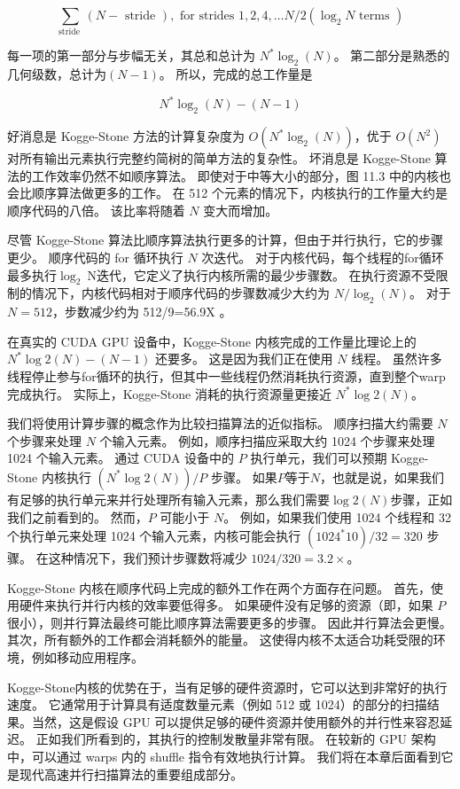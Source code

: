 $$
\sum_{\text {stride }}(N-\text { stride }), \text { for strides } 1,2,4, \ldots N / 2\left(\log_{2} N \text { terms }\right)
$$

每一项的第一部分与步幅无关，其总和总计为 $N^{*} \log _{2}(N)$。 第二部分是熟悉的几何级数，总计为$(N-1)$。 所以，完成的总工作量是

$$
N^{*} \log _{2}(N)-(N-1)
$$

好消息是 Kogge-Stone 方法的计算复杂度为 $O\left(N^{*} \log _{2}(N)\right)$，优于 $O\left(N^{ 2}\right)$ 对所有输出元素执行完整约简树的简单方法的复杂性。 坏消息是 Kogge-Stone 算法的工作效率仍然不如顺序算法。 即使对于中等大小的部分，图 11.3 中的内核也会比顺序算法做更多的工作。 在 512 个元素的情况下，内核执行的工作量大约是顺序代码的八倍。 该比率将随着 $N$ 变大而增加。

尽管 Kogge-Stone 算法比顺序算法执行更多的计算，但由于并行执行，它的步骤更少。 顺序代码的 for 循环执行 $N$ 次迭代。 对于内核代码，每个线程的for循环最多执行$\log _{2} \mathrm{~N}$迭代，它定义了执行内核所需的最少步骤数。 在执行资源不受限制的情况下，内核代码相对于顺序代码的步骤数减少大约为 $N / \log _{2}(N)$。 对于 $N=512$，步数减少约为 512/9=56.9X 。

在真实的 CUDA GPU 设备中，Kogge-Stone 内核完成的工作量比理论上的 $N^{*} \log 2(N)-(N-1)$ 还要多。 这是因为我们正在使用 $N$ 线程。 虽然许多线程停止参与for循环的执行，但其中一些线程仍然消耗执行资源，直到整个warp完成执行。 实际上，Kogge-Stone 消耗的执行资源量更接近 $N^{*} \log 2(N)$。

我们将使用计算步骤的概念作为比较扫描算法的近似指标。 顺序扫描大约需要 $N$ 个步骤来处理 $N$ 个输入元素。 例如，顺序扫描应采取大约 1024 个步骤来处理 1024 个输入元素。 通过 CUDA 设备中的 $P$ 执行单元，我们可以预期 Kogge-Stone 内核执行 $\left(N^{*} \log 2(N)\right) / P$ 步骤。 如果$P$等于$N$，也就是说，如果我们有足够的执行单元来并行处理所有输入元素，那么我们需要$\log 2(N)$步骤，正如我们之前看到的。 然而，$P$ 可能小于 $N$。 例如，如果我们使用 1024 个线程和 32 个执行单元来处理 1024 个输入元素，内核可能会执行 $\left(1024^{*} 10\right) / 32=320$ 步骤。 在这种情况下，我们预计步骤数将减少 $1024 / 320=3.2 \times$。

Kogge-Stone 内核在顺序代码上完成的额外工作在两个方面存在问题。 首先，使用硬件来执行并行内核的效率要低得多。 如果硬件没有足够的资源（即，如果 $P$ 很小），则并行算法最终可能比顺序算法需要更多的步骤。 因此并行算法会更慢。 其次，所有额外的工作都会消耗额外的能量。 这使得内核不太适合功耗受限的环境，例如移动应用程序。

Kogge-Stone内核的优势在于，当有足够的硬件资源时，它可以达到非常好的执行速度。 它通常用于计算具有适度数量元素（例如 512 或 1024）的部分的扫描结果。当然，这是假设 GPU 可以提供足够的硬件资源并使用额外的并行性来容忍延迟。 正如我们所看到的，其执行的控制发散量非常有限。 在较新的 GPU 架构中，可以通过 warps 内的 shuffle 指令有效地执行计算。 我们将在本章后面看到它是现代高速并行扫描算法的重要组成部分。


